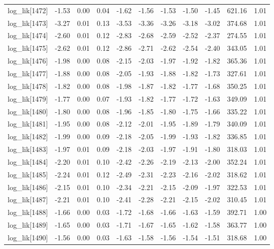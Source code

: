 \begin{table}[ht]
\begin{tabular}{rrrrrrrrrrr}
  log\_lik[1472] & -1.53 & 0.00 & 0.04 & -1.62 & -1.56 & -1.53 & -1.50 & -1.45 & 621.16 & 1.01 \\ 
  log\_lik[1473] & -3.27 & 0.01 & 0.13 & -3.53 & -3.36 & -3.26 & -3.18 & -3.02 & 374.68 & 1.01 \\ 
  log\_lik[1474] & -2.60 & 0.01 & 0.12 & -2.83 & -2.68 & -2.59 & -2.52 & -2.37 & 274.55 & 1.01 \\ 
  log\_lik[1475] & -2.62 & 0.01 & 0.12 & -2.86 & -2.71 & -2.62 & -2.54 & -2.40 & 343.05 & 1.01 \\ 
  log\_lik[1476] & -1.98 & 0.00 & 0.08 & -2.15 & -2.03 & -1.97 & -1.92 & -1.82 & 365.36 & 1.01 \\ 
  log\_lik[1477] & -1.88 & 0.00 & 0.08 & -2.05 & -1.93 & -1.88 & -1.82 & -1.73 & 327.61 & 1.01 \\ 
  log\_lik[1478] & -1.82 & 0.00 & 0.08 & -1.98 & -1.87 & -1.82 & -1.77 & -1.68 & 350.25 & 1.01 \\ 
  log\_lik[1479] & -1.77 & 0.00 & 0.07 & -1.93 & -1.82 & -1.77 & -1.72 & -1.63 & 349.09 & 1.01 \\ 
  log\_lik[1480] & -1.80 & 0.00 & 0.08 & -1.96 & -1.85 & -1.80 & -1.75 & -1.66 & 335.22 & 1.01 \\ 
  log\_lik[1481] & -1.95 & 0.00 & 0.08 & -2.12 & -2.01 & -1.95 & -1.89 & -1.79 & 340.09 & 1.01 \\ 
  log\_lik[1482] & -1.99 & 0.00 & 0.09 & -2.18 & -2.05 & -1.99 & -1.93 & -1.82 & 336.85 & 1.01 \\ 
  log\_lik[1483] & -1.97 & 0.01 & 0.09 & -2.18 & -2.03 & -1.97 & -1.91 & -1.80 & 318.03 & 1.01 \\ 
  log\_lik[1484] & -2.20 & 0.01 & 0.10 & -2.42 & -2.26 & -2.19 & -2.13 & -2.00 & 352.24 & 1.01 \\ 
  log\_lik[1485] & -2.24 & 0.01 & 0.12 & -2.49 & -2.31 & -2.23 & -2.16 & -2.02 & 318.62 & 1.01 \\ 
  log\_lik[1486] & -2.15 & 0.01 & 0.10 & -2.34 & -2.21 & -2.15 & -2.09 & -1.97 & 322.53 & 1.01 \\ 
  log\_lik[1487] & -2.21 & 0.01 & 0.10 & -2.41 & -2.28 & -2.21 & -2.15 & -2.02 & 310.45 & 1.01 \\ 
  log\_lik[1488] & -1.66 & 0.00 & 0.03 & -1.72 & -1.68 & -1.66 & -1.63 & -1.59 & 392.71 & 1.00 \\ 
  log\_lik[1489] & -1.65 & 0.00 & 0.03 & -1.71 & -1.67 & -1.65 & -1.62 & -1.58 & 363.77 & 1.00 \\ 
  log\_lik[1490] & -1.56 & 0.00 & 0.03 & -1.63 & -1.58 & -1.56 & -1.54 & -1.51 & 318.68 & 1.00 \\ 

\end{tabular}
\end{table}
